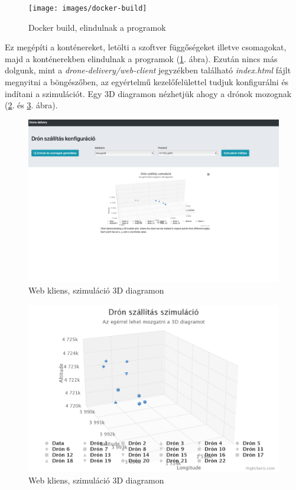 \begin{figure}[h]
    \centering
    \texttt{[image: images/docker-build]}
    \caption{Docker build, elindulnak a programok}
    \label{fig:docker-build}
\end{figure}

Ez megépíti a konténereket, letölti a szoftver függőségeket illetve csomagokat, majd a konténerekben elindulnak a programok (\ref{fig:docker-build}. ábra).
Ezután nincs más dolgunk, mint a \textit{drone-delivery/web-client} jegyzékben található \textit{index.html} fájlt megnyitni a böngészőben, az egyértelmű kezelőfelülettel tudjuk konfigurálni és indítani a szimulációt.
Egy 3D diagramon nézhetjük ahogy a drónok mozognak (\ref{fig:web-client}. és \ref{fig:web-client-diagram}. ábra).
\begin{figure}[h]
    \centering
    \includegraphics[scale=0.2]{images/web-client}
    \caption{Web kliens, szimuláció 3D diagramon}
    \label{fig:web-client}
\end{figure}

\begin{figure}[h]
    \centering
    \includegraphics[scale=0.3]{images/web-client-diagram}
    \caption{Web kliens, szimuláció 3D diagramon}
    \label{fig:web-client-diagram}
\end{figure}

